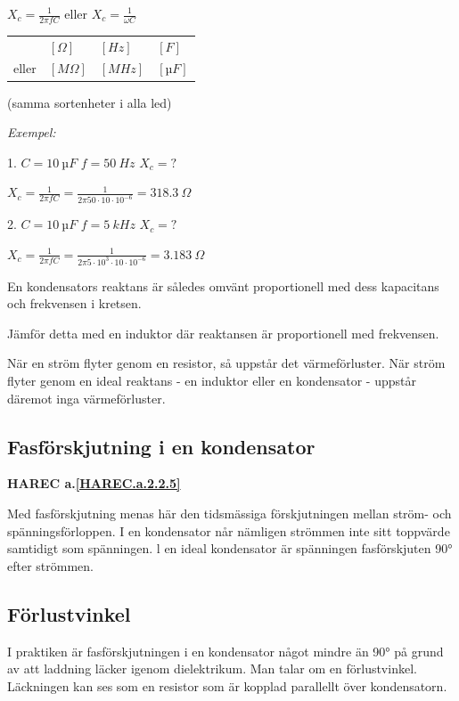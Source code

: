 \(X_c = \frac{1}{2πfC}\) eller \(X_c = \frac{1}{\omega C}\)

\begin{tabular}{llll}
  &  \([\Omega]\) & \([Hz]\) & \([F]\)    \\
  eller & \([M\Omega]\) & \([MHz]\) & \([µF]\)
\end{tabular}

(samma sortenheter i alla led)

\emph{Exempel:}

1. \(C = 10\ µF\) \(f = 50\ Hz\) \(X_c = ?\)

\(X_c = \frac{1}{2πfC} = \frac{1}{2π 50 \cdot 10 \cdot 10^{-6}} = 318.3\ Ω\)

2. \(C = 10\ µF\) \(f = 5\ kHz\) \(X_c = ?\)

\(X_c = \frac{1}{2πfC} = \frac{1}{2π 5 \cdot 10^3 \cdot 10 \cdot 10^{-6}}
= 3.183\ Ω\)

En kondensators reaktans är således omvänt proportionell med dess kapacitans
och frekvensen i kretsen.

Jämför detta med en induktor där reaktansen är proportionell med frekvensen.

När en ström flyter genom en resistor, så uppstår det värmeförluster. När ström
flyter genom en ideal reaktans - en induktor eller en kondensator - uppstår
däremot inga värmeförluster.

\subsection{Fasförskjutning i en kondensator}
\textbf{HAREC a.\ref{HAREC.a.2.2.5}\label{myHAREC.a.2.2.5}}

Med fasförskjutning menas här den tidsmässiga förskjutningen mellan ström- och
spänningsförloppen. I en kondensator når nämligen strömmen inte sitt toppvärde
samtidigt som spänningen. l en ideal kondensator är spänningen fasförskjuten 90°
efter strömmen.

\subsection{Förlustvinkel}

I praktiken är fasförskjutningen i en kondensator något mindre än 90° på grund
av att laddning läcker igenom dielektrikum. Man talar om en förlustvinkel.
Läckningen kan ses som en resistor som är kopplad parallellt över kondensatorn.

